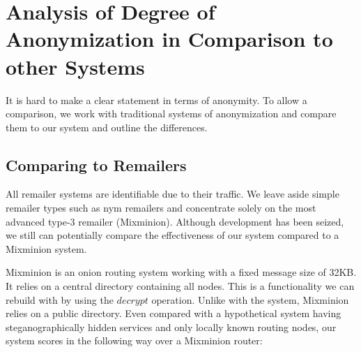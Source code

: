 \chapter{Analysis of Degree of Anonymization in Comparison to other Systems}
It is hard to make a clear statement in terms of anonymity. To allow a comparison, we work with traditional systems of anonymization and compare them to our system and outline the differences.

\section{Comparing \MessageVortex{} to Remailers}
All remailer systems are identifiable due to their traffic.  We leave aside simple remailer types such as nym remailers and concentrate solely on the most advanced type-3 remailer (Mixminion). Although development has been seized, we still can potentially compare the effectiveness of our system compared to a Mixminion system.

Mixminion is an onion routing system working with a fixed message size of 32KB. It relies on a central directory containing all nodes. This is a functionality we can rebuild with \MessageVortex{} by using the $decrypt$ operation. Unlike with the \MessageVortex{} system, Mixminion relies on a public directory. Even compared with a hypothetical system having steganographically hidden services and only locally known routing nodes, our system scores in the following way over a Mixminion router:

